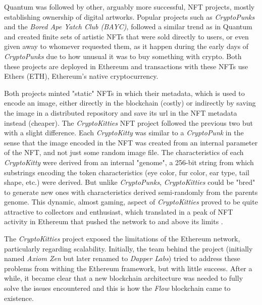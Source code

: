 \documentclass[../main.tex]{subfiles}
\begin{document}
Quantum was followed by other, arguably more successful, NFT projects, mostly establishing ownership of digital artworks. Popular projects such as \textit{CryptoPunks} \cite{nftnow2024} and the \textit{Bored Ape Yatch Club (BAYC)}, followed a similar trend as in Quantum and created finite sets of artistic NFTs that were sold directly to users, or even given away to whomever requested them, as it happen during the early days of \textit{CryptoPunks} due to how unusual it was to buy something with crypto. Both these projects are deployed in Ethereum and transactions with these NFTs use Ethers (ETH), Ethereum's native cryptocurrency.
\par
Both projects minted "static" NFTs in which their metadata, which is used to encode an image, either directly in the blockchain (costly) or indirectly by saving the image in a distributed repository and save its url in the NFT metadata instead (cheaper). The \textit{CryptoKitties} NFT project \cite{Dapper2017} followed the previous two but with a slight difference. Each \textit{CryptoKitty} was similar to a \textit{CryptoPunk} in the sense that the image encoded in the NFT was created from an internal parameter of the NFT, and not just some random image file. The characteristics of each \textit{CryptoKitty} were derived from an internal "genome", a 256-bit string from which substrings encoding the token characteristics (eye color, fur color, ear type, tail shape, etc.) were derived. But unlike \textit{CryptoPunks}, \textit{CryptoKitties} could be "bred" to generate new ones with characteristics derived semi-randomly from the parents genome. This dynamic, almost gaming, aspect of \textit{CryptoKitties} proved to be quite attractive to collectors and enthusiast, which translated in a peak of NFT activity in Ethereum that pushed the network to and above its limits \cite{bbc2017}.
\par
The \textit{CryptoKitties} project exposed the limitations of the Ethereum network, particularly regarding scalability. Initially, the team behind the project (initially named \textit{Axiom Zen} but later renamed to \textit{Dapper Labs}) tried to address these problems from withing the Ethereum framework, but with little success. After a while, it became clear that a new blockchain architecture was needed to fully solve the issues encountered and this is how the \textit{Flow} blockchain came to existence.
\par
\end{document}
